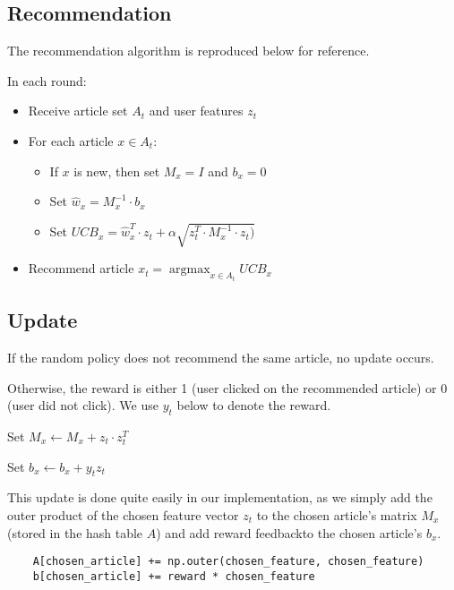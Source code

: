 \documentclass[a4paper, 11pt]{article}
\begin{document}
\subsection{Recommendation}

The recommendation algorithm is reproduced below for reference.
\newline

In each round:
\begin{itemize}

\item Receive article set $A_t$ and user features $z_t$
\item For each article $x \in A_t$:

\begin{itemize}

    \item If $x$ is new, then set $M_x = I$ and $b_x = 0$
    \item Set $\hat{w}_x = M_x^{-1} \cdot b_x$
    \item Set $UCB_x = \hat{w}_x^T \cdot z_t + \alpha \sqrt{z_t^T \cdot M_x^{-1} \cdot z_t)}$

\end{itemize}
        
\item Recommend article $x_t = 
    \operatorname{argmax}_{x \in A_t} UCB_x$
        
\end {itemize}


\subsection{Update}

If the random policy does not recommend the same article, no update occurs.

Otherwise, the reward is either 1 (user clicked on the recommended article) or 0 (user did not click). We use $y_t$ below to denote the reward.



Set $M_x \leftarrow M_x + z_t \cdot z_t^T$

Set $b_x \leftarrow b_x + y_t z_t$

This update is done quite easily in our implementation, as we simply add the outer product of the chosen feature vector $z_t$ to the chosen article's matrix $M_x$ (stored in the hash table $A$) and add reward feedbackto the chosen article's $b_x$.
\begin{verbatim}
    A[chosen_article] += np.outer(chosen_feature, chosen_feature)
    b[chosen_article] += reward * chosen_feature
\end{verbatim}
\end{document}
